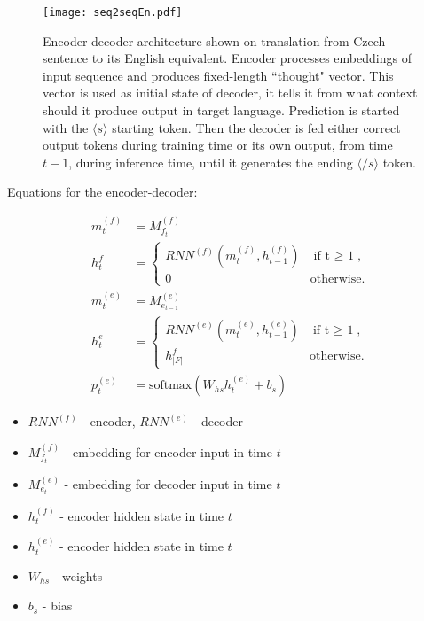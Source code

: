 \documentclass{ExcelAtFIT}
\begin{document}
\begin{figure*}[h!]\centering %
  \centering
  \texttt{[image: seq2seqEn.pdf]}\\[1pt]
  \caption{Encoder-decoder architecture shown on translation from Czech sentence to its English equivalent. Encoder processes embeddings of input sequence and produces fixed-length ``thought" vector. This vector is used as initial state of decoder, it tells it from what context should it produce output in target language. Prediction is started with the $\langle s \rangle$ starting token. Then the decoder is fed either correct output tokens during training time or its own output, from time $t - 1$, during inference time, until it generates the ending $\langle /s \rangle$ token.}
  \label{fig:seq2seq}
\end{figure*}

Equations for the encoder-decoder:
\begin{linenomath}
\begin{align}
    m^{(f)}_{t}&=M^{(f)}_{f_t}\label{figure:encoderEmb} \\
    h^{f}_{t}&=\begin{cases}
                    RNN^{(f)}(m^{(f)}_{t},h^{(f)}_{t-1}) & \mbox{if t $\geq$ 1},\label{figure:encoderState} \\
                    0 & \mbox{otherwise}.
                \end{cases}\\
    m^{(e)}_{t}&=M^{(e)}_{e_{t-1}}\label{figure:decoderEmb} \\
    h^{e}_{t}&=\begin{cases}
                    RNN^{(e)}(m^{(e)}_{t},h^{(e)}_{t-1}) & \mbox{if t $\geq$ 1},\\
                    h^{f}_{|F|} & \mbox{otherwise}.
                \end{cases}\label{figure:decoderState} \\
    p^{(e)}_{t}&=\mbox{softmax}(W_{hs}h^{(e)}_{t} + b_{s}) \label{figure:resultSoftmax}
\end{align}
\end{linenomath}

\begin{itemize}
    \item $RNN^(f)$ - encoder, $RNN^(e)$ - decoder
    \item $M^{(f)}_{f_t}$ - embedding for encoder input in time $t$    
    \item $M^{(e)}_{e_t}$ - embedding for decoder input in time $t$
    \item $h^{(f)}_t$ - encoder hidden state in time $t$
    \item $h^{(e)}_t$ - encoder hidden state in time $t$
    \item $W_{hs}$ - weights
    \item $b_s$ - bias
\end{itemize}
\end{document}
